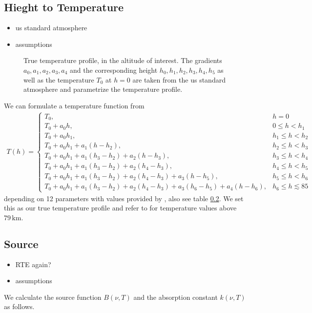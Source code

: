 \subsection{Hieght to Temperature}
\begin{itemize}
	\item us standard atmosphere
	\item assumptions
\end{itemize}
\begin{figure}[ht!]
	\centering
	\caption{True temperature profile, in the altitude of interest.
		The gradients $a_0,a_1,a_2,a_3,a_4$ and the corresponding height $h_0,h_1,h_2,h_3,h_4,h_5$ as well as the temperature $T_0$ at $h = 0$ are taken from the us standard atmosphere and parametrize the temperature profile.}
	\label{fig:nter-label}
\end{figure}
We can formulate a temperature function from \cite{atmosphere1976us}
\begin{align}
	T(h) = \begin{cases*}
		T_0, & \text{$h = 0$}\\
		T_0 + a_0 h , & \text{$0 \leq h < h_{1}$}\\
		T_0 + a_0 h_1, & \text{$h_{1} \leq  h < h_{2}$}\\
		T_0 + a_0 h_1 + a_1 (h   - h_2),  & \text{$h_{2} \leq h < h_{3}$}\\
		T_0 + a_0 h_1 + a_1 (h_3 - h_2) + a_2 (h   - h_3), & \text{$h_{3} \leq h < h_{4}$}\\
		T_0 + a_0 h_1 + a_1 (h_3 - h_2) + a_2 (h_4 - h_3), & \text{$h_{4} \leq h < h_{5}$}\\
		T_0 + a_0 h_1 + a_1 (h_3 - h_2) + a_2 (h_4 - h_3) + a_3 (h   - h_5), & \text{$h_{5} \leq h < h_{6}$}\\
		T_0 + a_0 h_1 + a_1 (h_3 - h_2) + a_2 (h_4 - h_3) + a_3 (h_6 - h_5) + a_4 (h - h_6), & \text{$h_{6} \leq h \lesssim 85$}
	\end{cases*} 
\end{align}
depending on 12 parameters with values provided by \cite{}, also see table \ref{}.
We set this as our true temperature profile and refer to \cite{} for temperature values above $79 \,\text{km}$.


\subsection{Source}
\begin{itemize}
	\item RTE again?
	\item assumptions
\end{itemize}
We calculate the source function $B(\nu, T)$ and the absorption constant $ k(\nu, T)$ as follows.

